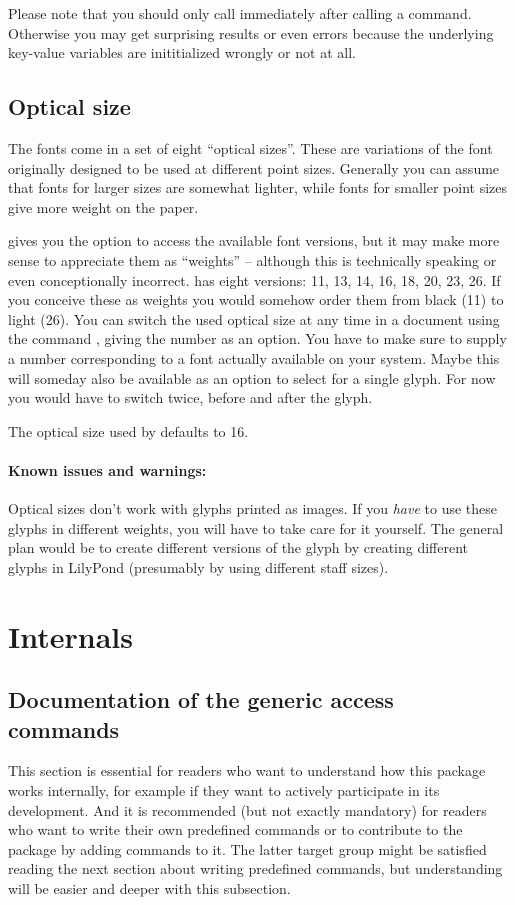 \documentclass{article}
\begin{document}
Please note that you should only call  immediately after calling a  command. Otherwise you may get surprising results or even errors because the underlying key-value variables are inititialized wrongly or not at all.

\subsection{Optical size}
\label{subsec:optical_size}
The \emmentaler fonts come in a set of eight \enquote{optical sizes}.
These are variations of the font originally designed to be used at different point sizes.
Generally you can assume that fonts for larger sizes are somewhat lighter, while fonts for smaller point sizes give more weight on the paper.

\lilyglyphs gives you the option to access the available font versions, but it may make more sense to appreciate them as \enquote{weights} -- although this is technically speaking or even conceptionally incorrect.
\emmentaler has eight versions: 11, 13, 14, 16, 18, 20, 23, 26. 
If you conceive these as weights you would somehow order them from black (11) to light (26).
You can switch the used optical size at any time in a document using the command , giving the number as an option. 
You have to make sure to supply a number corresponding to a font actually available on your system.
Maybe this will someday also be available as an option to select for a single glyph.
For now you would have to switch twice, before and after the glyph.

The optical size used by \lilyglyphs defaults to 16.

\paragraph*{Known issues and warnings:}
Optical sizes don't work with glyphs printed as images.
If you \emph{have} to use these glyphs in different weights, you will have to take care for it yourself.
The general plan would be to create different versions of the glyph by creating different glyphs in LilyPond (presumably by using different staff sizes).

\section{Internals}
\label{sec:internals}

\subsection{Documentation of the generic access commands}
\label{subsec:internals_generic_access}
This section is essential for readers who want to understand how this package works internally, for example if they want to actively participate in its development.
And it is recommended (but not exactly mandatory) for readers who want to write their own predefined commands or to contribute to the package by adding commands to it. 
The latter target group might be satisfied reading the next section about writing predefined commands, but understanding will be easier and deeper with this subsection.
\end{document}
